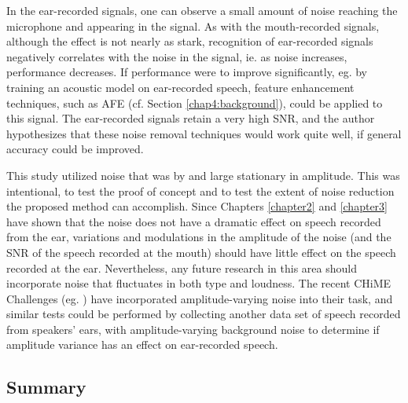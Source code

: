 In the ear-recorded signals, one can observe a small amount of noise reaching the microphone and appearing in the signal.  As with the mouth-recorded signals, although the effect is not nearly as stark, recognition of ear-recorded signals negatively correlates with the noise in the signal, ie. as noise increases, performance decreases.   If performance were to improve significantly, eg. by training an acoustic model on ear-recorded speech, feature enhancement techniques, such as AFE (cf. Section \ref{chap4:background}), could be applied to this signal.  The ear-recorded signals retain a very high SNR, and the author hypothesizes that these noise removal techniques would work quite well, if general accuracy could be improved.


This study utilized noise that was by and large stationary in amplitude.  This was intentional, to test the proof of concept and to test the extent of noise reduction the proposed method can accomplish.  Since Chapters \ref{chapter2} and \ref{chapter3} have shown that the noise does not have a dramatic effect on speech recorded from the ear, variations and modulations in the amplitude of the noise (and the SNR of the speech recorded at the mouth) should have little effect on the speech recorded at the ear.  Nevertheless, any future research in this area should incorporate noise that fluctuates in both type and loudness.  The recent CHiME Challenges (eg. \cite{chime:16}) have incorporated amplitude-varying noise into their task, and similar tests could be performed by collecting another data set of speech recorded from speakers' ears, with amplitude-varying background noise to determine if amplitude variance has an effect on ear-recorded speech.

\subsection{Summary}
\label{chap4:summary}

